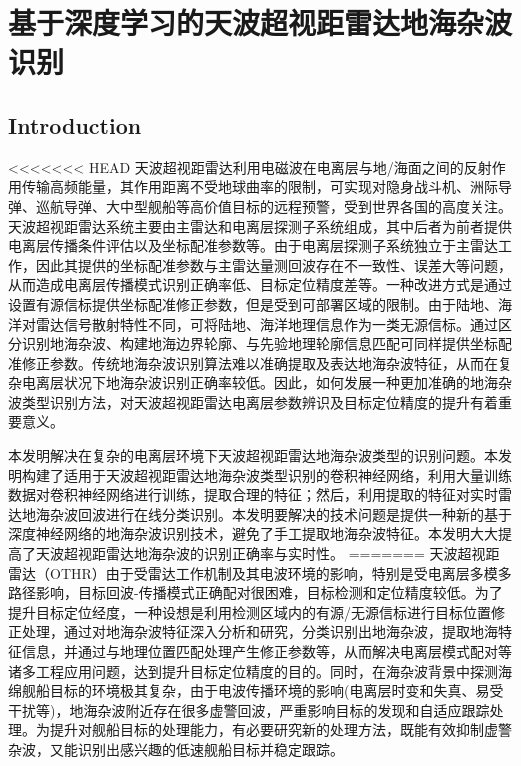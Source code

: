 \chapter{基于深度学习的天波超视距雷达地海杂波识别}
\section{Introduction}
%
<<<<<<< HEAD
天波超视距雷达利用电磁波在电离层与地/海面之间的反射作用传输高频能量，其作用距离不受地球曲率的限制，可实现对隐身战斗机、洲际导弹、巡航导弹、大中型舰船等高价值目标的远程预警，受到世界各国的高度关注。天波超视距雷达系统主要由主雷达和电离层探测子系统组成，其中后者为前者提供电离层传播条件评估以及坐标配准参数等。由于电离层探测子系统独立于主雷达工作，因此其提供的坐标配准参数与主雷达量测回波存在不一致性、误差大等问题，从而造成电离层传播模式识别正确率低、目标定位精度差等。一种改进方式是通过设置有源信标提供坐标配准修正参数，但是受到可部署区域的限制。由于陆地、海洋对雷达信号散射特性不同，可将陆地、海洋地理信息作为一类无源信标。通过区分识别地海杂波、构建地海边界轮廓、与先验地理轮廓信息匹配可同样提供坐标配准修正参数。传统地海杂波识别算法难以准确提取及表达地海杂波特征，从而在复杂电离层状况下地海杂波识别正确率较低。因此，如何发展一种更加准确的地海杂波类型识别方法，对天波超视距雷达电离层参数辨识及目标定位精度的提升有着重要意义。

本发明解决在复杂的电离层环境下天波超视距雷达地海杂波类型的识别问题。本发明构建了适用于天波超视距雷达地海杂波类型识别的卷积神经网络，利用大量训练数据对卷积神经网络进行训练，提取合理的特征；然后，利用提取的特征对实时雷达地海杂波回波进行在线分类识别。本发明要解决的技术问题是提供一种新的基于深度神经网络的地海杂波识别技术，避免了手工提取地海杂波特征。本发明大大提高了天波超视距雷达地海杂波的识别正确率与实时性。
=======
天波超视距雷达（OTHR）由于受雷达工作机制及其电波环境的影响，特别是受电离层多模多路径影响，目标回波-传播模式正确配对很困难，目标检测和定位精度较低。为了提升目标定位经度，一种设想是利用检测区域内的有源/无源信标进行目标位置修正处理，通过对地海杂波特征深入分析和研究，分类识别出地海杂波，提取地海特征信息，并通过与地理位置匹配处理产生修正参数等，从而解决电离层模式配对等诸多工程应用问题，达到提升目标定位精度的目的。同时，在海杂波背景中探测海绵舰船目标的环境极其复杂，由于电波传播环境的影响(电离层时变和失真、易受干扰等)，地海杂波附近存在很多虚警回波，严重影响目标的发现和自适应跟踪处理。为提升对舰船目标的处理能力，有必要研究新的处理方法，既能有效抑制虚警杂波，又能识别出感兴趣的低速舰船目标并稳定跟踪。

